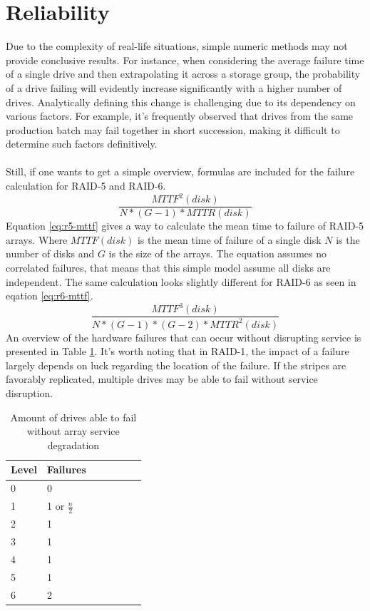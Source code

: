 \documentclass{article}
\begin{document}
\section{Reliability}
Due to the complexity of real-life situations, simple numeric methods may not provide conclusive results. For instance, when considering the average failure time of a single drive and then extrapolating it across a storage group, the probability of a drive failing will evidently increase significantly with a higher number of drives. Analytically defining this change is challenging due to its dependency on various factors. For example, it's frequently observed that drives from the same production batch may fail together in short succession, making it difficult to determine such factors definitively. \cite{cmu:raidhighperf}
\\ \\
Still, if one wants to get a simple overview, formulas are included for the failure calculation for RAID-5
and RAID-6.
\begin{equation}
    \label{eq:r5-mttf}
    \frac{MTTF^2(disk)}{N*(G-1)*MTTR(disk)}
\end{equation}
Equation \ref{eq:r5-mttf} gives a way to calculate the mean time to failure
of RAID-5 arrays.
Where \(MTTF(disk)\) is the mean time of failure of a single disk
\(N\) is the number of disks and \(G\) is the size of the arrays.
The equation assumes no correlated failures, that means that
this simple model assume all disks are independent.
The same calculation looks slightly different for RAID-6 as seen
in eqation \ref{eq:r6-mttf}. \cite{cmu:raidhighperf}
\begin{equation}
    \label{eq:r6-mttf}
    \frac
    {MTTF^3(disk)}
    {N*(G-1)*(G-2)*MTTR^2(disk)}
\end{equation}
An overview of the hardware failures that can occur without disrupting service is presented in Table \ref{tab:reliability}. It's worth noting that in RAID-1, the impact of a failure largely depends on luck regarding the location of the failure. If the stripes are favorably replicated, multiple drives may be able to fail without service disruption. \cite{uw:raid} 
\begin{table}[h]
    \begin{tabularx}{\textwidth}{l|X|X|X|X|X|X}
        \textbf{Level} &
        Failures \\
        \hline
        0 & 0 \\
        1 & 1 or \( \frac{n}{2} \) \\
        2 & 1 \\
        3 & 1 \\
        4 & 1 \\
        5 & 1 \\
        6 & 2 \\
       \end{tabularx}
    \caption{Amount of drives able to fail without array service degradation \cite{uw:raid}}
    \label{tab:reliability}
\end{table}
\pagebreak
\end{document}
